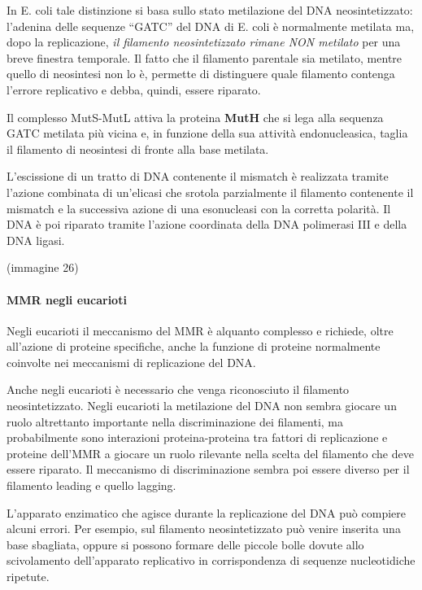 \documentclass[]{article}
\begin{document}
In E. coli tale distinzione si basa sullo stato metilazione del DNA
neosintetizzato: l'adenina delle sequenze ``GATC'' del DNA di E. coli è
normalmente metilata ma, dopo la replicazione, \emph{il filamento
neosintetizzato rimane NON metilato} per una breve finestra temporale.
Il fatto che il filamento parentale sia metilato, mentre quello di
neosintesi non lo è, permette di distinguere quale filamento contenga
l'errore replicativo e debba, quindi, essere riparato.

Il complesso MutS-MutL attiva la proteina \textbf{MutH} che si lega alla
sequenza GATC metilata più vicina e, in funzione della sua attività
endonucleasica, taglia il filamento di neosintesi di fronte alla base
metilata.

L'escissione di un tratto di DNA contenente il mismatch è realizzata
tramite l'azione combinata di un'elicasi che srotola parzialmente il
filamento contenente il mismatch e la successiva azione di una
esonucleasi con la corretta polarità. Il DNA è poi riparato tramite
l'azione coordinata della DNA polimerasi III e della DNA ligasi.

(immagine 26)

\paragraph{MMR negli eucarioti}\label{mmr-negli-eucarioti}

Negli eucarioti il meccanismo del MMR è alquanto complesso e richiede,
oltre all'azione di proteine specifiche, anche la funzione di proteine
normalmente coinvolte nei meccanismi di replicazione del DNA.

Anche negli eucarioti è necessario che venga riconosciuto il filamento
neosintetizzato. Negli eucarioti la metilazione del DNA non sembra
giocare un ruolo altrettanto importante nella discriminazione dei
filamenti, ma probabilmente sono interazioni proteina-proteina tra
fattori di replicazione e proteine dell'MMR a giocare un ruolo rilevante
nella scelta del filamento che deve essere riparato. Il meccanismo di
discriminazione sembra poi essere diverso per il filamento leading e
quello lagging.

L'apparato enzimatico che agisce durante la replicazione del DNA può
compiere alcuni errori. Per esempio, sul filamento neosintetizzato può
venire inserita una base sbagliata, oppure si possono formare delle
piccole bolle dovute allo scivolamento dell'apparato replicativo in
corrispondenza di sequenze nucleotidiche ripetute.
\end{document}
